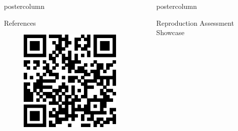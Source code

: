 \begin{frame}
\begin{columns}
\begin{column}{.42\textwidth}
\begin{beamercolorbox}[center]{postercolumn}
\begin{minipage}{.98\textwidth}
{\begin{myblock}{References}
\begin{minipage}{.3\textwidth}
\begin{figure}
								\includegraphics[width=0.9\textwidth]{img/qr.eps}
							\end{figure}
						\end{minipage}
						\begin{minipage}{.69\textwidth}
							\scriptsize
                                                        
                                                        
						\end{minipage}
					\end{myblock}\vfill
		}\end{minipage}\end{beamercolorbox}
	\end{column}
	\begin{column}{.59\textwidth}
		\begin{beamercolorbox}[center]{postercolumn}
			\begin{minipage}{.98\textwidth} %
				\parbox[t][\columnheight]{\textwidth}{ %
					\begin{myblock}{Reproduction Assessment Showcase}
						\vspace{-0.45em}
						\begin{minipage}{.58\textwidth}
						\begin{figure}

\end{figure}
\end{minipage}
\end{myblock}}
\end{minipage}
\end{beamercolorbox}
\end{column}
\end{columns}
\end{frame}
